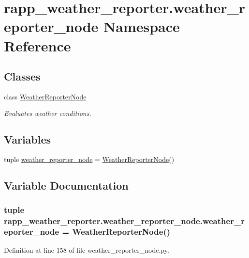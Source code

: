\hypertarget{namespacerapp__weather__reporter_1_1weather__reporter__node}{\section{rapp\-\_\-weather\-\_\-reporter.\-weather\-\_\-reporter\-\_\-node Namespace Reference}
\label{namespacerapp__weather__reporter_1_1weather__reporter__node}
}
\subsection*{Classes}
\begin{DoxyCompactItemize}
\item 
class \hyperlink{classrapp__weather__reporter_1_1weather__reporter__node_1_1WeatherReporterNode}{Weather\-Reporter\-Node}
\begin{DoxyCompactList}\small\item\em Evaluates weather conditions. \end{DoxyCompactList}\end{DoxyCompactItemize}
\subsection*{Variables}
\begin{DoxyCompactItemize}
\item 
tuple \hyperlink{namespacerapp__weather__reporter_1_1weather__reporter__node_a5ac658971af27ea7aed979aa364e0c0c}{weather\-\_\-reporter\-\_\-node} = \hyperlink{classrapp__weather__reporter_1_1weather__reporter__node_1_1WeatherReporterNode}{Weather\-Reporter\-Node}()
\end{DoxyCompactItemize}


\subsection{Variable Documentation}
\hypertarget{namespacerapp__weather__reporter_1_1weather__reporter__node_a5ac658971af27ea7aed979aa364e0c0c}{
\subsubsection[{weather\-\_\-reporter\-\_\-node}]{\setlength{\rightskip}{0pt plus 5cm}tuple rapp\-\_\-weather\-\_\-reporter.\-weather\-\_\-reporter\-\_\-node.\-weather\-\_\-reporter\-\_\-node = {\bf Weather\-Reporter\-Node}()}}\label{namespacerapp__weather__reporter_1_1weather__reporter__node_a5ac658971af27ea7aed979aa364e0c0c}


Definition at line 158 of file weather\-\_\-reporter\-\_\-node.\-py.

